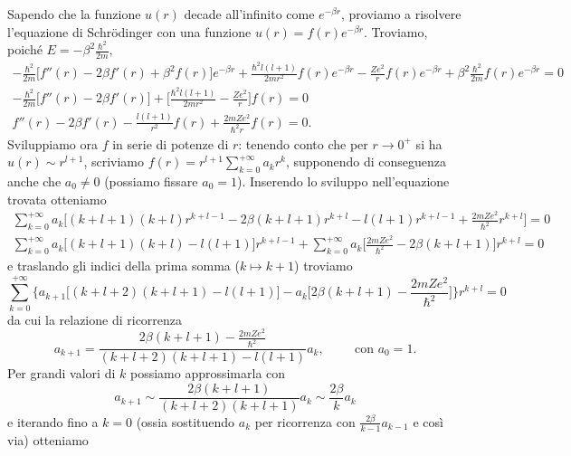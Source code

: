 Sapendo che la funzione $u(r)$ decade all'infinito come $e^{-\beta r}$, proviamo a risolvere l'equazione di Schr\"odinger con una funzione $u(r)=f(r)e^{-\beta r}$.
Troviamo, poich\'e $E=-\beta^2\frac{\hbar^2}{2m}$,
\begin{equation}
	\begin{gathered}
		-\frac{\hbar^2}{2m}\big[f''(r)-2\beta f'(r)+\beta^2 f(r)\big]e^{-\beta r}+\frac{\hbar^2l(l+1)}{2mr^2}f(r)e^{-\beta r}-\frac{Ze^2}{r}f(r)e^{-\beta r}+\beta^2\frac{\hbar^2}{2m}f(r)e^{-\beta r}=0\\
		-\frac{\hbar^2}{2m}\big[f''(r)-2\beta f'(r)\big]+\bigg[\frac{\hbar^2l(l+1)}{2mr^2}-\frac{Ze^2}{r}\bigg]f(r)=0\\
		f''(r)-2\beta f'(r)-\frac{l(l+1)}{r^2}f(r)+\frac{2mZe^2}{\hbar^2r}f(r)=0.
	\end{gathered}
\end{equation}
Sviluppiamo ora $f$ in serie di potenze di $r$: tenendo conto che per $r\to 0^+$ si ha $u(r)\sim r^{l+1}$, scriviamo $f(r)=r^{l+1}\sum_{k=0}^{+\infty}a_kr^k$, supponendo di conseguenza anche che $a_0\ne 0$ (possiamo fissare $a_0=1$).
Inserendo lo sviluppo nell'equazione trovata otteniamo
\begin{equation}
	\begin{gathered}
		\sum_{k=0}^{+\infty}a_k\bigg[(k+l+1)(k+l)r^{k+l-1}-2\beta(k+l+1)r^{k+l}-l(l+1)r^{k+l-1}+\frac{2mZe^2}{\hbar^2}r^{k+l}\bigg]=0\\
		\sum_{k=0}^{+\infty}a_k\big[(k+l+1)(k+l)-l(l+1)\big]r^{k+l-1}+\sum_{k=0}^{+\infty}a_k\bigg[\frac{2mZe^2}{\hbar^2}-2\beta(k+l+1)\bigg]r^{k+l}=0
	\end{gathered}
\end{equation}
e traslando gli indici della prima somma ($k\mapsto k+1$) troviamo
\begin{equation}
	\sum_{k=0}^{+\infty}\bigg\{a_{k+1}\big[(k+l+2)(k+l+1)-l(l+1)\big]-a_k\bigg[2\beta(k+l+1)-\frac{2mZe^2}{\hbar^2}\bigg]\bigg\}r^{k+l}=0
\end{equation}
da cui la relazione di ricorrenza
\begin{equation}
	a_{k+1}=\frac{2\beta(k+l+1)-\frac{2mZe^2}{\hbar^2}}{(k+l+2)(k+l+1)-l(l+1)}a_k,\hspace{1cm}\text{con }a_0=1.
\end{equation}
Per grandi valori di $k$ possiamo approssimarla con
\begin{equation}
	a_{k+1}\sim\frac{2\beta(k+l+1)}{(k+l+2)(k+l+1)}a_k\sim\frac{2\beta}{k}a_k
\end{equation}
e iterando fino a $k=0$ (ossia sostituendo $a_k$ per ricorrenza con $\frac{2\beta}{k-1}a_{k-1}$ e cos\`i via) otteniamo
